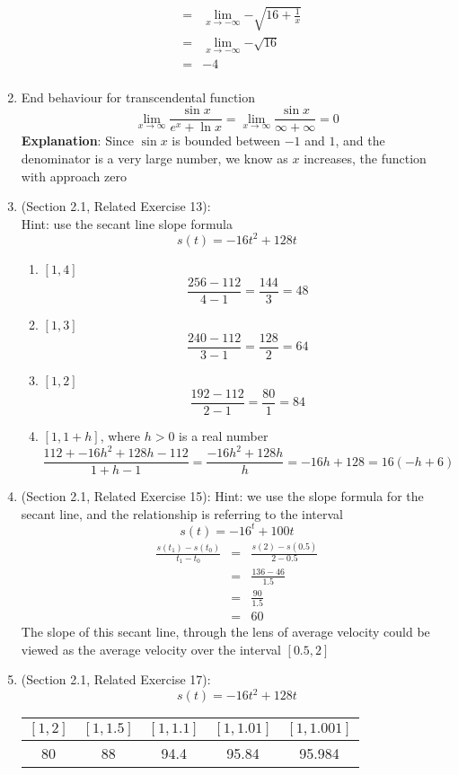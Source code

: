 \documentclass{article}
\begin{document}
\begin{enumerate}
\begin{eqnarray}
			&=& \lim_{x \to - \infty}{- \sqrt{16 + \frac{1}{x}}} \\
			&=& \lim_{x \to - \infty}{- \sqrt{16}} \\
			&=& -4 \\
		\end{eqnarray}
	\item End behaviour for transcendental function
		$$\lim_{x \to \infty}{\frac{\sin{x}}{e^x + \ln{x}}} = \lim_{x \to \infty}{\frac{\sin{x}}{\infty + \infty}} = 0$$
		\textbf{Explanation}: Since $\sin{x}$ is bounded between $-1$ and $1$, and the denominator is a very large number, we know as $x$ increases, the function with approach zero
    \item (Section 2.1, Related Exercise 13):
    	\\Hint: use the secant line slope formula
    	$$s(t) = -16t^2 + 128t$$
        \begin{enumerate}
    	    \item $[1, 4]$
    	        $$\frac{256 - 112}{4 - 1} = \frac{144}{3} = 48$$
    	    \item $[1, 3]$
    	        $$\frac{240 - 112}{3 - 1} = \frac{128}{2} = 64$$
    	    \item $[1, 2]$
    	        $$\frac{192 - 112}{2 - 1} = \frac{80}{1} = 84$$
    	    \item $[1, 1 + h]$, where $h > 0$ is a real number
    	        $$\frac{112 + -16h^2 + 128h - 112}{1 + h - 1} = \frac{-16h^2 + 128h}{h} = -16h + 128 = 16(-h + 6)$$
        \end{enumerate}
    \item (Section 2.1, Related Exercise 15):
    	Hint: we use the slope formula for the secant line, and the relationship is referring to the interval
    	$$s(t) = -16^t + 100t$$
    	\begin{eqnarray}
    	\frac{s(t_1) - s(t_0)}{t_1 - t_0} &=& \frac{s(2) - s(0.5)}{2 - 0.5} \\
    	&=& \frac{136 - 46}{1.5} \\
    	&=& \frac{90}{1.5} \\
    	&=& 60
    	\end{eqnarray}
    	The slope of this secant line, through the lens of average velocity could be viewed as the average velocity over the interval $[0.5, 2]$
    \item (Section 2.1, Related Exercise 17):
        $$s(t) = -16t^2 + 128t$$
    
	    \begin{tabular}{| c | c | c | c | c |}
            \hline
            $[1,2]$&$[1,1.5]$&$[1,1.1]$&$[1,1.01]$&$[1,1.001]$ \\
            \hline
    	    80 & 88 & 94.4 & 95.84 & 95.984 \\
            \hline
        \end{tabular} \\


\end{enumerate}
\end{document}
